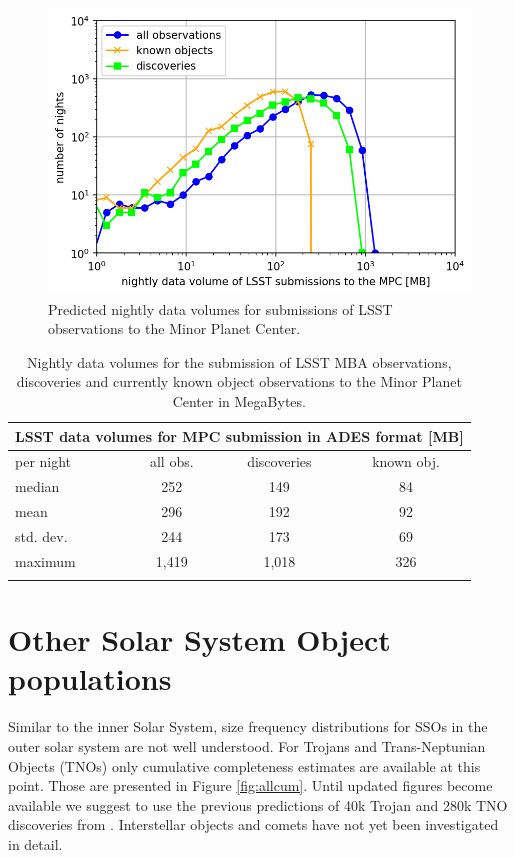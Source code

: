 \begin{figure}[tb!]
\begin{center}
\includegraphics[width=0.70\linewidth]{figs/data2.png}
\end{center}
\caption{Predicted nightly data volumes for submissions of \gls{LSST} observations to the Minor Planet \gls{Center}.}
\label{fig:data}       %
\end{figure}
\clearpage

\begin{table}[tb!]
\begin{center}
\begin{tabular}{lccc}
\multicolumn{4}{c}{LSST data volumes for \gls{MPC} submission in \gls{ADES} format [MB]}\\
\hline\hline
per night & all obs. & discoveries & known obj. \\\hline
median  & 252 &149  &84  \\
mean & 296 & 192 & 92   \\
std. dev. & 244 & 173& 69 \\
maximum & 1,419 & 1,018 & 326 \\
\hline\hline\\
\end{tabular}
\end{center}
\caption{Nightly data volumes for the submission of \gls{LSST} \gls{MBA} observations, discoveries and currently known object observations to the Minor Planet \gls{Center} in MegaBytes.}
\label{tab:data_stats}
\end{table}

\clearpage
\section{Other Solar System \gls{Object} populations}\label{sec:other}
Similar to the inner Solar System, size frequency distributions for SSOs in the outer solar system are not well understood.
For Trojans and Trans-Neptunian Objects (TNOs) only cumulative completeness estimates are available at this point. Those are presented in Figure \ref{fig:allcum}.
Until updated figures become available we suggest to use the previous predictions of 40k Trojan and 280k \gls{TNO} discoveries from \citet{jones2015asteroid}.
Interstellar objects and comets have not yet been investigated in detail.

